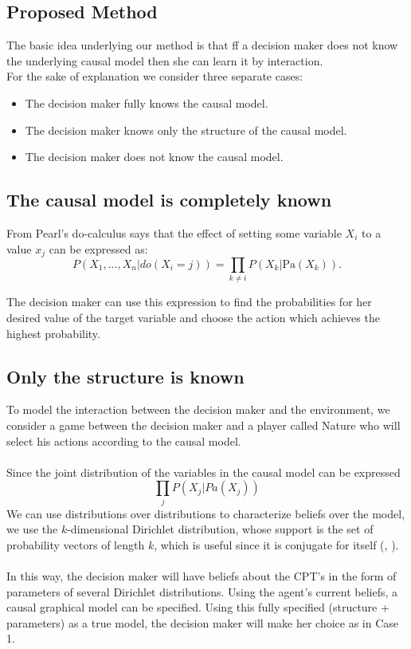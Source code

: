 \documentclass[a0,portrait]{a0poster}
\begin{document}
\begin{multicols}{3}
\section*{Proposed Method}
The basic idea underlying our method is that ff a decision maker does not know the underlying causal model then she can learn it by interaction.
\\
For the sake of explanation we consider three separate cases:
\begin{itemize}
\item The decision maker fully knows the causal model.
\item The decision maker knows only the structure of the causal model.
\item The decision maker does not know the causal model.
\end{itemize}

\subsection{The causal model is completely known}{\label{known}}
From Pearl's do-calculus \cite{pearl2009causality} says that the effect of setting some variable $X_i$ to a value $x_j$ can be expressed as:
\[ P(X_1,...,X_n | do(X_i = j )) = \prod_{k \neq i} P(X_k | \textrm{Pa}(X_k)). \]

The decision maker can use this expression to find the probabilities for her desired value of the target variable and choose the action which achieves the highest probability.

\subsection{Only the structure is known}
To model the interaction between the decision maker and the environment, we consider a game between the decision maker and a player called Nature who will select his actions according to the causal model.\\
\\
Since the joint distribution of the variables in the causal model can be expressed  
\[ \prod_j P(X_j | Pa(X_j))\]
We can use distributions over distributions to characterize beliefs over the model, we use the $k$-dimensional Dirichlet distribution, whose support is the set of probability vectors of length $k$, which is useful since it is conjugate for itself (\cite{hjort2010bayesian}, \cite{bernardo2000bayesian}).\\
\\
In this way, the decision maker will have beliefs about the CPT's in the form of parameters of several Dirichlet distributions. Using the agent's current beliefs, a causal graphical model can be specified. Using this fully specified (structure + parameters) as a true model, the decision maker will make her choice as in Case 1. 




\end{multicols}
\end{document}
